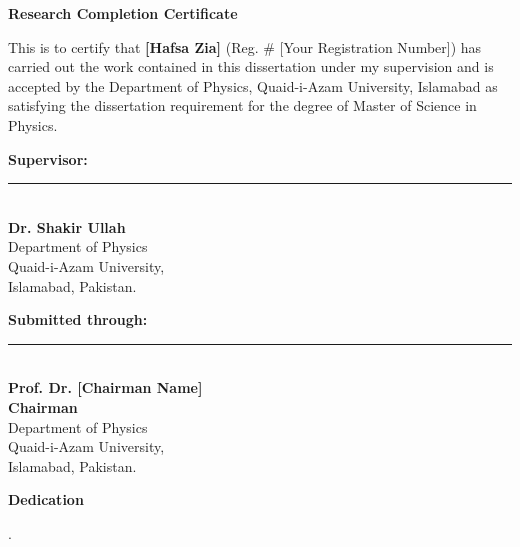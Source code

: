 \documentclass[12pt,a4paper]{report}
\begin{document}
\newpage
\begin{titlepage}
	 \begin{center}
		{\Large \textbf{Research Completion Certificate}}
	\end{center}
	\vspace{0.4cm}
	This is to certify that \textbf{[Hafsa Zia]} (Reg. \# [Your Registration Number]) has carried out the work contained in this dissertation under my supervision and is accepted by the Department of Physics, Quaid-i-Azam University, Islamabad as satisfying the dissertation requirement for the degree of Master of Science in Physics.\\
	\vspace{1cm}

	\begin{flushright}
		\textbf{Supervisor:}\\[6pt]
		\vspace{1cm}
		\rule{3.5cm}{0.4pt}\\
		\textbf{Dr. Shakir Ullah}\\
		Department of Physics\\
		Quaid-i-Azam University,\\
		Islamabad, Pakistan.
	\end{flushright}
	\vspace{1cm}
	\textbf{Submitted through:}\\[12pt]

	\begin{flushleft}
		\rule{3.5cm}{0.4pt}\\
		\textbf{Prof. Dr. [Chairman Name]}\\
		\textbf{Chairman}\\
		Department of Physics\\
		Quaid-i-Azam University,\\
		Islamabad, Pakistan.
	\end{flushleft}
\end{titlepage}

\newpage
\begin{titlepage}
 \begin{center}
	{\Large \textbf{Dedication}}
\end{center}
\vspace{0.4cm}
.\\
\end{titlepage}
\end{document}
